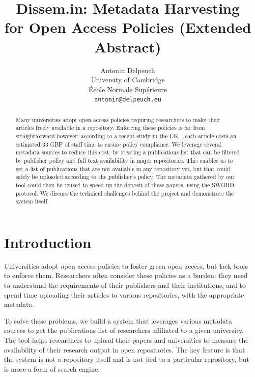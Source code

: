 \documentclass[a4paper]{article}
\begin{document}
\title{Dissem.in: Metadata Harvesting for Open Access Policies (Extended Abstract)}
\author{Antonin Delpeuch \\
University of Cambridge \\
École Normale Supérieure \\
\texttt{antonin@delpeuch.eu}}

\maketitle

\begin{abstract}
Many universities adopt open access policies requiring researchers to make their articles freely
available in a repository. Enforcing these policies is far from straightforward however: according to
a recent study in the UK~\cite{research2014counting},
each article costs an estimated 33 GBP of staff time to ensure policy
compliance. We leverage several metadata sources to reduce this cost,
by creating a publications list that can be filtered by publisher policy and full text availability in
major repositories. This enables us to get a list of publications that are not available in any
repository yet, but that could safely be uploaded according to the publisher's policy. The
metadata gathered by our tool could then be reused to speed up the deposit of these papers,
using the SWORD protocol.
We discuss the technical challenges behind the project and demonstrate the system itself.
\end{abstract}

\section{Introduction}

Universities adopt open access policies to foster green open
access, but lack tools to enforce them.
Researchers often consider these policies as a burden: they need to
understand the requirements of their publishers and their institutions,
and to spend time uploading their articles to various repositories, with
the appropriate metadata.

To solve these problems, we build a
system that leverages various metadata sources to get the publications
list of researchers affiliated to a given university. The tool helps
researchers to upload their papers and universities to measure the
availability of their research output in open repositories. The key
feature is that the system is not a repository itself and is not tied to
a particular repository, but is more a form of search engine.
\end{document}
